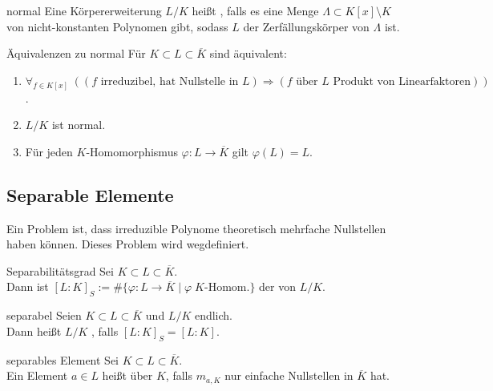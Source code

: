 \begin{Def}{normal}
    Eine Körpererweiterung $L/K$ heißt , falls
    es eine Menge $\Lambda \subset K[x] \setminus K$ von nicht-konstanten
    Polynomen gibt, sodass $L$ der Zerfällungskörper von $\Lambda$ ist.
\end{Def}

\begin{Prop}{Äquivalenzen zu normal}
    Für $K \subset L \subset \overline{K}$ sind äquivalent:
    \begin{enumerate}[label=(\alph*)]
        \item
        $\forall_{f \in K[x]}\;
        ((f \text{ irreduzibel, hat Nullstelle in } L) \Rightarrow
        (f \text{ über } L \text{ Produkt von Linearfaktoren}))$.

        \item
        $L/K$ ist normal.

        \item
        Für jeden $K$-Homomorphismus $\varphi\colon L \rightarrow \overline{K}$
        gilt $\varphi(L) = L$.
    \end{enumerate}
\end{Prop}

\subsection{%
    Separable Elemente%
}

\begin{Bem}
    Ein Problem ist, dass irreduzible Polynome theoretisch mehrfache
    Nullstellen haben können.
    Dieses Problem wird wegdefiniert.
\end{Bem}

\begin{Def}{Separabilitätsgrad}
    Sei $K \subset L \subset \overline{K}$.\\
    Dann ist
    $[L:K]_S := \#\{\varphi\colon L \rightarrow \overline{K} \;|\;
    \varphi\; K\text{-Homom.}\}$
    der  von $L/K$.
\end{Def}

\begin{Def}{separabel}
    Seien $K \subset L \subset \overline{K}$ und $L/K$ endlich.\\
    Dann heißt $L/K$ , falls $[L:K]_S = [L:K]$.
\end{Def}

\begin{Def}{separables Element}
    Sei $K \subset L \subset \overline{K}$.\\
    Ein Element $a \in L$ heißt  über $K$, falls
    $m_{a,K}$ nur einfache Nullstellen in $\overline{K}$ hat.
\end{Def}

